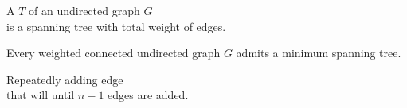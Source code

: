 \begin{frame}{}
  \begin{definition}
    A  $T$ of an  undirected graph $G$ \\
    is a spanning tree with  total weight of edges.
  \end{definition}

  \pause
  \vspace{0.50cm}

  \pause
  \begin{center}
  \end{center}
\end{frame}

\begin{frame}{}
  \begin{theorem}
    Every weighted connected undirected graph $G$ admits a minimum spanning tree.
  \end{theorem}

  \pause
\end{frame}

\begin{frame}{}

  \begin{center}
  \end{center}
\end{frame}

\begin{frame}{}
  \begin{center}
    Repeatedly adding  edge \\[5pt]
    that will 
    until $n-1$ edges are added.
  \end{center}

  \pause
\end{frame}

\begin{frame}{}

  \begin{center}
  \end{center}
\end{frame}

